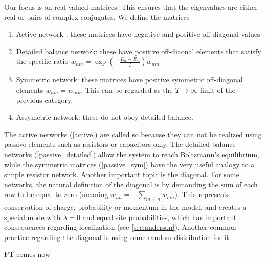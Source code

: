 Our focus is on real-valued matrices. This ensures that the eigenvalues
are either real or  pairs of complex conjugates.
%
%
We define the matrices 
\begin{enumerate}
  \item
       \label{active} 
       Active network : these matrices have negative and positive off-diagonal values
  \item
       \label{passive_detailed}
       Detailed balance network: these have positive off-diaonal elements 
       that satisfy the specific ratio $w_{nm} = \exp\left({-\frac{E_n-E_m}{T}}\right) w_{mn}$
  \item
       \label{passive_sym} Symmetric network: these matrices have positive 
       symmetric off-diagonal elements $w_{nm} = w_{mn}$. This can be regarded
       as the $T\rightarrow \infty$ limit of the previous category.
  \item\label{passive_general}
       Assymetric network: these do not obey detailed balance.
\end{enumerate}
%
The active networks (\ref{active}) are called so because they can 
not be realized using passive elements such as resistors or capacitors only.
The detailed balance networks (\ref{passive_detailed}) allow the system
to reach Boltzmann's equilibrium, while the symmetric matrices (\ref{passive_sym}) 
have the very useful analogy to a simple resistor network.  
Another important topic is the diagonal. For some networks, the
natural definition of the diagonal is by demanding the sum of each row to 
be equal to zero (meaning $w_{nn} = -\sum_{m\ne n} w_{mn}$).
This represents conservation of charge, probability or momentum
in the model, and creates a special mode with $\lambda=0$ and
equal site probabilities, which has important consequences 
regarding localization (see \ref{sec:anderson}). 
Another common practice regarding the diagonal is using some random distribution for it.

PT comes now

